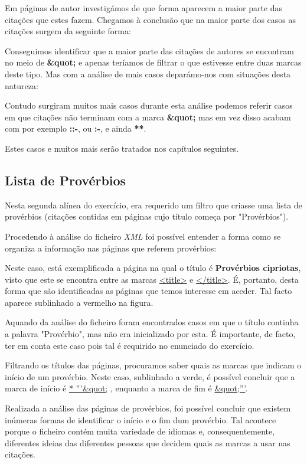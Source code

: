 \documentclass[11pt,a4paper]{report}
\begin{document}
Em páginas de autor investigámos de que forma aparecem a maior parte das citações que estes fazem. Chegamos à conclusão que na maior parte dos casos as citações surgem da seguinte forma:

Conseguimos identificar que a maior parte das citações de autores se encontram no meio de \textbf{\&quot;} e apenas teríamos de filtrar o que estivesse entre duas marcas deste tipo. Mas com a análise de mais casos deparámo-nos com situações desta natureza:


Contudo surgiram muitos mais casos durante esta análise podemos referir casos em que citações não terminam com a marca \textbf{\&quot;} mas em vez disso acabam com por exemplo \textbf{::-}, ou \textbf{:-}, e ainda \textbf{**}.

Estes casos e muitos mais serão tratados nos capítulos seguintes.


\newpage

\subsection{Lista de Provérbios}
\label{subsec:analise2}

Nesta segunda alínea do exercício, era requerido um filtro que criasse uma lista de provérbios (citações contidas em páginas cujo título começa por "Provérbios").

Procedendo à análise do ficheiro \textit{XML} foi possível entender a forma como se organiza a informação nas páginas que referem provérbios:


Neste caso, está exemplificada a página na qual o título é \textbf{Provérbios cipriotas}, visto que este se encontra entre as marcas \underline{<title>} e \underline{</title>}. É, portanto, desta forma que são identificadas as páginas que temos interesse em aceder. Tal facto aparece sublinhado a vermelho na figura.

Aquando da análise do ficheiro foram encontrados casos em que o título continha a palavra "Provérbio", mas não era inicializado por esta. É importante, de facto, ter em conta este caso pois tal é requirido no enunciado do exercício.

Filtrando os títulos das páginas, procuramos saber quais as marcas que indicam o início de um provérbio. Neste caso, sublinhado a verde, é possível concluir que a marca de início é \underline{* '''\&quot;} , enquanto a marca de fim é \underline{\&quot;'''}.

Realizada a análise das páginas de provérbios, foi possível concluir que existem inúmeras formas de identificar o início e o fim dum provérbio. Tal acontece porque o ficheiro contém muita variedade de idiomas e, consequentemente, diferentes ideias das diferentes pessoas que decidem quais as marcas a usar nas citações.
\end{document}
